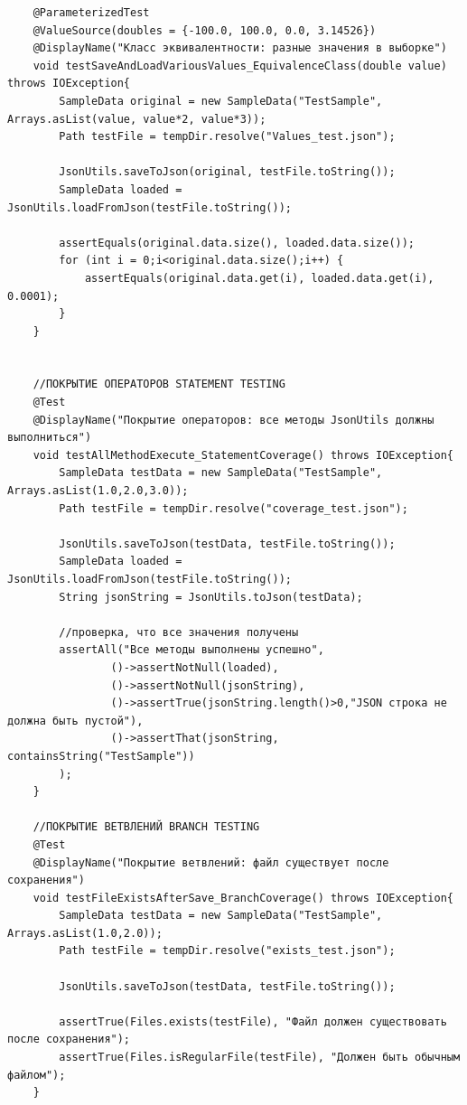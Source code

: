 \begin{verbatim}
    @ParameterizedTest
    @ValueSource(doubles = {-100.0, 100.0, 0.0, 3.14526})
    @DisplayName("Класс эквивалентности: разные значения в выборке")
    void testSaveAndLoadVariousValues_EquivalenceClass(double value) throws IOException{
        SampleData original = new SampleData("TestSample", Arrays.asList(value, value*2, value*3));
        Path testFile = tempDir.resolve("Values_test.json");

        JsonUtils.saveToJson(original, testFile.toString());
        SampleData loaded = JsonUtils.loadFromJson(testFile.toString());

        assertEquals(original.data.size(), loaded.data.size());
        for (int i = 0;i<original.data.size();i++) {
            assertEquals(original.data.get(i), loaded.data.get(i), 0.0001);
        }
    }


    //ПОКРЫТИЕ ОПЕРАТОРОВ STATEMENT TESTING
    @Test
    @DisplayName("Покрытие операторов: все методы JsonUtils должны выполниться")
    void testAllMethodExecute_StatementCoverage() throws IOException{
        SampleData testData = new SampleData("TestSample", Arrays.asList(1.0,2.0,3.0));
        Path testFile = tempDir.resolve("coverage_test.json");

        JsonUtils.saveToJson(testData, testFile.toString());
        SampleData loaded = JsonUtils.loadFromJson(testFile.toString());
        String jsonString = JsonUtils.toJson(testData);

        //проверка, что все значения получены
        assertAll("Все методы выполнены успешно",
                ()->assertNotNull(loaded),
                ()->assertNotNull(jsonString),
                ()->assertTrue(jsonString.length()>0,"JSON строка не должна быть пустой"),
                ()->assertThat(jsonString, containsString("TestSample"))
        );
    }

    //ПОКРЫТИЕ ВЕТВЛЕНИЙ BRANCH TESTING
    @Test
    @DisplayName("Покрытие ветвлений: файл существует после сохранения")
    void testFileExistsAfterSave_BranchCoverage() throws IOException{
        SampleData testData = new SampleData("TestSample", Arrays.asList(1.0,2.0));
        Path testFile = tempDir.resolve("exists_test.json");

        JsonUtils.saveToJson(testData, testFile.toString());

        assertTrue(Files.exists(testFile), "Файл должен существовать после сохранения");
        assertTrue(Files.isRegularFile(testFile), "Должен быть обычным файлом");
    }


\end{verbatim}
